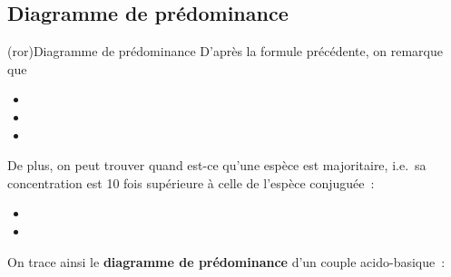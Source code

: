 \documentclass[../../main/main.tex]{subfiles}
\begin{document}
\subsection{Diagramme de prédominance}
\begin{tcb*}(ror){Diagramme de prédominance}
	D'après la formule précédente, on remarque que
	\begin{itemize}
		\item \psw{
		      $[\ce{AH}] = [\ce{A-}] \Ra \pH = \pk$
		      }
		\item {}
		\item {}
	\end{itemize}
	De plus, on peut trouver quand est-ce qu'une espèce est majoritaire, i.e.\ sa
	concentration est 10 fois supérieure à celle de l'espèce conjuguée~:
	\begin{itemize}
		\item {}
		\item {}
	\end{itemize}
	On trace ainsi le \textbf{diagramme de prédominance} d'un couple
	acido-basique~:
	\begin{center}
	\end{center}
\end{tcb*}
\end{document}
